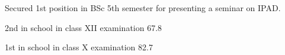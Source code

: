 \documentclass[]{mmynayak-resume-openfont}
\begin{document}
\begin{minipage}[t]{0.66\textwidth}
\begin{tightemize}
\end{tightemize}
\sectionsep

\begin{tightemize}
\item Secured 1st position in BSc 5th semester for
presenting a seminar on IPAD.
\item 2nd in school in class XII examination 67.8 %
\item 1st in school in class X examination 82.7 %
\end{tightemize}
\sectionsep

\end{minipage} 
\end{document}
